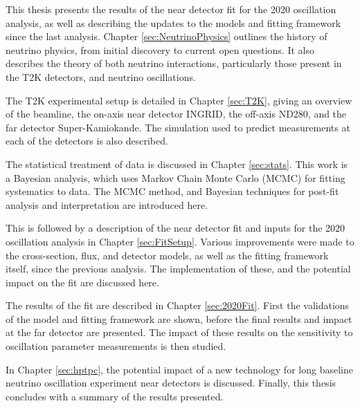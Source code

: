 This thesis presents the results of the near detector fit for the 2020 oscillation analysis, as well as describing the updates to the models and fitting framework since the last analysis. Chapter \ref{sec:NeutrinoPhysics} outlines the history of neutrino physics, from initial discovery to current open questions. It also describes the theory of both neutrino interactions, particularly those present in the T2K detectors, and neutrino oscillations.

The T2K experimental setup is detailed in Chapter \ref{sec:T2K}, giving an overview of the beamline, the on-axis near detector INGRID, the off-axis ND280, and the far detector Super-Kamiokande. The simulation used to predict measurements at each of the detectors is also described.

The statistical treatment of data is discussed in Chapter \ref{sec:stats}. This work is a Bayesian analysis, which uses Markov Chain Monte Carlo (MCMC) for fitting systematics to data. The MCMC method, and Bayesian techniques for post-fit analysis and interpretation are introduced here.

This is followed by a description of the near detector fit and inputs for the 2020 oscillation analysis in Chapter \ref{sec:FitSetup}. Various improvements were made to the cross-section, flux, and detector models, as well as the fitting framework itself, since the previous analysis. The implementation of these, and the potential impact on the fit are discussed here.

The results of the fit are described in Chapter \ref{sec:2020Fit}. First the validations of the model and fitting framework are shown, before the final results and impact at the far detector are presented. The impact of these results on the sensitivity to oscillation parameter measurements is then studied.

In Chapter \ref{sec:hptpc}, the potential impact of a new technology for long baseline neutrino oscillation experiment near detectors is discussed. Finally, this thesis concludes with a summary of the results presented.

\newpage